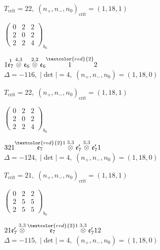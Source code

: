 \documentclass[10pt]{article}
\begin{document}
\hspace{1em}$T_{\text{crit}}=22,\; (n_+,n_-,n_0)_{\text{crit}}=(1,18,1)$

\hspace{2em}$\left(\begin{smallmatrix}0 & 2 & 2 \\ 2 & 0 & 2 \\ 2 & 2 & 4\end{smallmatrix}\right)_{\!b_0}$

\smallskip

$1\overset{1}{\mathfrak{e}_7}\overset{4,3}{\otimes}\mathfrak{e}_6\overset{2,2}{\otimes}\mathfrak{e}_6\overset{\textcolor{red}{2}}{1}2$ \quad $\Delta=-116,\; |\det|=4,\; (n_+,n_-,n_0)=(1,18,0)$

\hspace{1em}$T_{\text{crit}}=22,\; (n_+,n_-,n_0)_{\text{crit}}=(1,18,1)$

\hspace{2em}$\left(\begin{smallmatrix}0 & 2 & 2 \\ 2 & 0 & 2 \\ 2 & 2 & 4\end{smallmatrix}\right)_{\!b_0}$

\smallskip

$321\overset{\textcolor{red}{2}1}{\mathfrak{e}_7}\overset{3,3}{\otimes}\mathfrak{e}_7'\overset{3,3}{\otimes}\mathfrak{e}_7'1$ \quad $\Delta=-124,\; |\det|=4,\; (n_+,n_-,n_0)=(1,18,0)$

\hspace{1em}$T_{\text{crit}}=21,\; (n_+,n_-,n_0)_{\text{crit}}=(1,18,1)$

\hspace{2em}$\left(\begin{smallmatrix}0 & 2 & 2 \\ 2 & 5 & 5 \\ 2 & 5 & 5\end{smallmatrix}\right)_{\!b_0}$

\smallskip

$21\mathfrak{e}_7'\overset{3,3}{\otimes}\overset{\textcolor{red}{2}1}{\mathfrak{e}_7}\overset{3,3}{\otimes}\mathfrak{e}_7'12$ \quad $\Delta=-115,\; |\det|=4,\; (n_+,n_-,n_0)=(1,18,0)$
\end{document}
